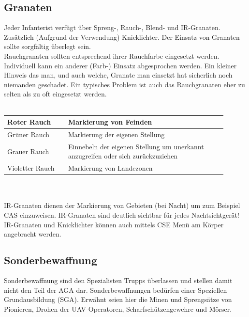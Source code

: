 \subsection{Granaten}
Jeder Infanterist verfügt über Spreng-, Rauch-, Blend- und \acf{IR}-Granaten. Zusätzlich (Aufgrund der Verwendung) Knicklichter. Der Einsatz von Granaten sollte sorgfältig überlegt sein. \\
Rauchgranaten sollten entsprechend ihrer Rauchfarbe eingesetzt werden. Individuell kann ein anderer (Farb-) Einsatz abgesprochen werden. Ein kleiner Hinweis das man, und auch welche, Granate man einsetzt hat sicherlich noch niemanden geschadet. Ein typisches Problem ist auch das Rauchgranaten eher zu selten als zu oft eingesetzt werden. \\
\\
\begin{tabular} {|p{0.25\linewidth}|p{0.65\linewidth}|} \hline
Roter Rauch		& Markierung von Feinden\\ \hline
Grüner Rauch	& Markierung der eigenen Stellung \\ \hline
Grauer Rauch	& Einnebeln der eigenen Stellung um unerkannt anzugreifen oder sich zurückzuziehen\\ \hline 
Violetter Rauch & Markierung von Landezonen \\ \hline
\end{tabular}\\
\\
\ac{IR}-Granaten dienen der Markierung von Gebieten (bei Nacht) um zum Beispiel \ac{CAS} einzuweisen. \ac{IR}-Granaten sind deutlich sichtbar für jedes Nachtsichtgerät! \ac{IR}-Granaten und Knicklichter können auch mittels \ac{CSE} Menü am Körper angebracht werden.

\subsection{Sonderbewaffnung}
Sonderbewaffnung sind den Spezialisten Trupps überlassen und stellen damit nicht den Teil der \ac{AGA} dar. Sonderbewaffnungen bedürfen einer Speziellen Grundausbildung (\ac{SGA}). Erwähnt seien hier die Minen und Sprengsätze von Pionieren, Drohen der \ac{UAV}-Operatoren, Scharfschützengewehre und Mörser. \\


